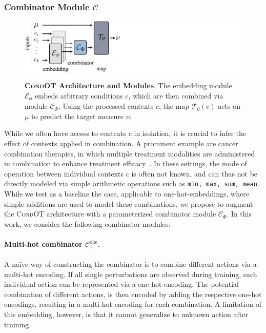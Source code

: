 \subsubsection{Combinator Module $\mathcal{C}$}
\begin{figure}
    \centering
    \includegraphics[width=\textwidth]{figures/fig_architecture.pdf}
    \caption{\textbf{\textsc{CondOT} Architecture and Modules}. The embedding module $\mathcal{E}_\phi$ embeds arbitrary conditions $c$, which are then combined via module $\mathcal{C}_\Phi$. Using the processed contexts $c$, the map $\mathcal{T}_\theta(c)$ acts on $\mu$ to predict the target measure $\nu$.}
    \label{fig:architecture}
\end{figure}
 While we often have access to contexts $c$ in isolation, it is crucial to infer the effect of contexts applied in combination. A prominent example are cancer combination therapies, in which multiple treatment modalities are administered in combination to enhance treatment efficacy~\citep{kummar2010utilizing}.
In these settings, the mode of operation between individual contexts $c$ is often not known, and can thus not be directly modeled via simple arithmetic operations such as 
\texttt{min, max, sum, mean}.
While we test as a baseline the case, applicable to one-hot-embeddings, where simple additions are used to model these combinations, we propose to augment the \textsc{CondOT} architecture with a parameterized combinator module $\mathcal{C}_\Phi$. In this work, we consider the following combinator modules:

\paragraph{Multi-hot combinator $\mathcal{C}^\text{ohe}_+$.}
A na\"ive way of constructing the combinator is to combine different actions via a multi-hot encoding. If all single perturbations are observed during training, each individual action can be represented via a one-hot encoding. The potential combination of different actions, is then encoded by adding the respective one-hot encodings, resulting in a multi-hot encoding for each combination.
A limitation of this embedding, however, is that it cannot generalize to unknown action after training.


